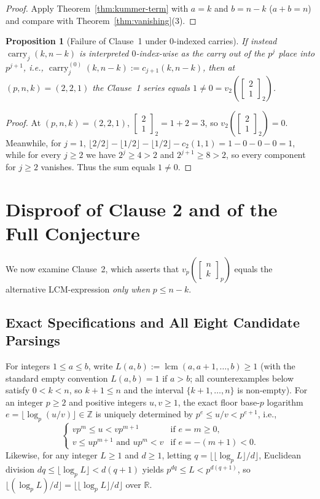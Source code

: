 \documentclass[11pt,a4paper]{article}
\newtheorem{proposition}[theorem]{Proposition}
\theoremstyle{definition}
\theoremstyle{remark}
\newcommand{\qbinom}[3]{\begin{bmatrix} #1 \\ #2 \end{bmatrix}_{#3}}
\newcommand{\lcm}{\operatorname{lcm}}
\newcommand{\carry}{\operatorname{carry}}
\begin{document}
\begin{proof}
Apply Theorem~\ref{thm:kummer-term} with $a = k$ and $b = n - k$ ($a + b = n$) and
compare with Theorem~\ref{thm:vanishing}(3).
\end{proof}

\begin{proposition}[Failure of Clause~1 under $0$-indexed carries]
\label{prop:clause1-0idx}
If instead $\carry_j(k,n-k)$ is interpreted $0$-index-wise as the carry out of the
$p^j$ place into $p^{j+1}$, i.e., $\carry_j^{(0)}(k,n-k) := c_{j+1}(k,n-k)$, then at
$(p,n,k) = (2,2,1)$ the Clause~1 series equals $1 \neq 0
= v_2\!\left(\qbinom{2}{1}{2}\right)$.
\end{proposition}

\begin{proof}
At $(p,n,k) = (2,2,1)$, $\qbinom{2}{1}{2} = 1 + 2 = 3$, so
$v_2\!\left(\qbinom{2}{1}{2}\right) = 0$. Meanwhile, for $j = 1$,
$\lfloor 2/2 \rfloor - \lfloor 1/2 \rfloor - \lfloor 1/2 \rfloor - c_2(1,1)
= 1 - 0 - 0 - 0 = 1$, while for every $j \ge 2$ we have $2^j \ge 4 > 2$ and
$2^{j+1} \ge 8 > 2$, so every component for $j \ge 2$ vanishes. Thus the sum equals
$1 \neq 0$.
\end{proof}

\section{Disproof of Clause 2 and of the Full Conjecture}

We now examine Clause~2, which asserts that $v_p\!\left(\qbinom{n}{k}{p}\right)$
equals the alternative LCM-expression \emph{only when} $p \le n - k$.

\subsection{Exact Specifications and All Eight Candidate Parsings}

For integers $1 \le a \le b$, write $L(a,b) := \lcm(a, a+1, \dots, b) \ge 1$ (with
the standard empty convention $L(a,b) = 1$ if $a > b$; all counterexamples below satisfy
$0 < k < n$, so $k + 1 \le n$ and the interval $\{k+1,\dots,n\}$ is non-empty).
For an integer $p \ge 2$ and positive integers $u, v \ge 1$, the exact floor
base-$p$ logarithm $e = \lfloor \log_p(u/v) \rfloor \in \mathbb{Z}$ is uniquely
determined by $p^e \le u/v < p^{e+1}$, i.e.,
\[
  \begin{cases}
    v p^m \le u < v p^{m+1} & \text{if } e = m \ge 0,\\[2pt]
    v \le u p^{m+1} \text{ and } u p^m < v & \text{if } e = -(m+1) < 0.
  \end{cases}
\]
Likewise, for any integer $L \ge 1$ and $d \ge 1$, letting
$q = \lfloor \lfloor \log_p L \rfloor / d \rfloor$, Euclidean division
$d q \le \lfloor \log_p L \rfloor < d(q+1)$ yields $p^{d q} \le L < p^{d(q+1)}$, so
$\lfloor (\log_p L) / d \rfloor = \lfloor \lfloor \log_p L \rfloor / d \rfloor$ over
$\mathbb{R}$.
\end{document}
